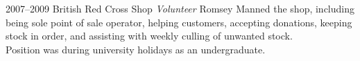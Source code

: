 \documentclass[print, oneside]{friggeri-cv} %
\begin{document}
\begin{entrylist}

\entry
{2007--2009}
{British Red Cross Shop {\normalfont \emph{Volunteer}}}
{Romsey}
{Manned the shop, including being sole point of sale operator, helping customers, accepting donations, keeping stock in order, and assisting with weekly culling of unwanted stock.\\
Position was during university holidays as an undergraduate.}




\end{entrylist}

%
%
%
%
%
%







%
%
\end{document}
